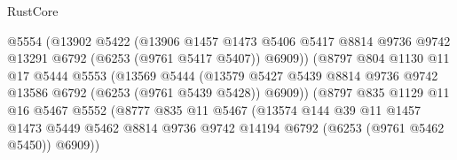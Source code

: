 \begin{lexlean}{RustCore}
\begin{coremodule}
                                @5554
                                (@13902
                                  @5422
                                  (@13906
                                    @1457
                                    @1473
                                    @5406
                                    @5417
                                    @8814
                                    @9736
                                    @9742
                                    @13291
                                    @6792
                                    (@6253 (@9761 @5417 @5407))
                                    @6909))
                                (@8797
                                  @804
                                  @1130
                                  @11
                                  @17
                                  @5444
                                  @5553
                                  (@13569
                                    @5444
                                    (@13579
                                      @5427
                                      @5439
                                      @8814
                                      @9736
                                      @9742
                                      @13586
                                      @6792
                                      (@6253 (@9761 @5439 @5428))
                                      @6909))
                                  (@8797
                                    @835
                                    @1129
                                    @11
                                    @16
                                    @5467
                                    @5552
                                    (@8777
                                      @835
                                      @11
                                      @5467
                                      (@13574
                                        @144
                                        @39
                                        @11
                                        @1457
                                        @1473
                                        @5449
                                        @5462
                                        @8814
                                        @9736
                                        @9742
                                        @14194
                                        @6792
                                        (@6253 (@9761 @5462 @5450))
                                        @6909))

\end{coremodule}
\end{lexlean}
